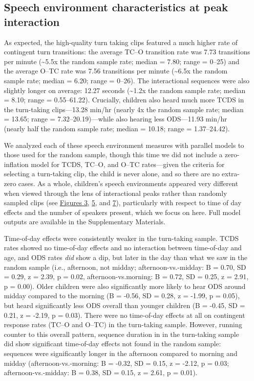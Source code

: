 \documentclass[floatsintext,man]{apa6}
\theoremstyle{definition}
\theoremstyle{definition}
\theoremstyle{definition}
\theoremstyle{remark}
\begin{document}
\subsection{Speech environment characteristics at peak
interaction}\label{speech-environment-characteristics-at-peak-interaction}

As expected, the high-quality turn taking clips featured a much higher
rate of contingent turn transitions: the average TC--O transition rate
was 7.73 transitions per minute (\textasciitilde{}5.5x the random sample
rate; median = 7.80; range = 0--25) and the average O--TC rate was 7.56
transitions per minute (\textasciitilde{}6.5x the random sample rate;
median = 6.20; range = 0--26). The interactional sequences were also
slightly longer on average: 12.27 seconds (\textasciitilde{}1.2x the
random sample rate; median = 8.10; range = 0.55--61.22). Crucially,
children also heard much more TCDS in the turn-taking clips---13.28
min/hr (nearly 4x the random sample rate; median = 13.65; range =
7.32--20.19)---while also hearing less ODS---11.93 min/hr (nearly half
the random sample rate; median = 10.18; range = 1.37--24.42).

We analyzed each of these speech environment measures with parallel
models to those used for the random sample, though this time we did not
include a zero-inflation model for TCDS, TC--O, and O--TC rates---given
the criteria for selecting a turn-taking clip, the child is never alone,
and so there are no extra-zero cases. As a whole, children's speech
environments appeared very different when viewed through the lens of
interactional peaks rather than randomly sampled clips (see
\protect\hyperlink{fig3}{Figures 3}, \protect\hyperlink{fig5}{5}, and
\protect\hyperlink{fig7}{7}), particularly with respect to time of day
effects and the number of speakers present, which we focus on here. Full
model outputs are available in the Supplementary Materials.

Time-of-day effects were consistently weaker in the turn-taking sample.
TCDS rates showed no time-of-day effects and no interaction between
time-of-day and age, and ODS rates \emph{did} show a dip, but later in
the day than what we saw in the random sample (i.e., afternoon, not
midday; afternoon-vs.-midday: B = 0.70, SD = 0.29, z = 2.39, p = 0.02,
afternoon-vs.morning: B = 0.72, SD = 0.25, z = 2.91, p = 0.00). Older
children were also significantly more likely to hear ODS around midday
compared to the morning (B = -0.56, SD = 0.28, z = -1.99, p = 0.05), but
heard significantly less ODS overall than younger children (B = -0.45,
SD = 0.21, z = -2.19, p = 0.03). There were no time-of-day effects at
all on contingent response rates (TC--O and O--TC) in the turn-taking
sample. However, running counter to this overall pattern, sequence
duration in in the turn-taking sample did show significant time-of-day
effects not found in the random sample: sequences were significantly
longer in the afternoon compared to morning and midday
(afternoon-vs.-morning: B = -0.32, SD = 0.15, z = -2.12, p = 0.03;
afternoon-vs.-midday: B = 0.38, SD = 0.15, z = 2.61, p = 0.01).
\end{document}
